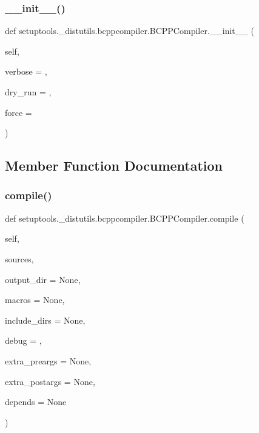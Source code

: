 \subsubsection{\texorpdfstring{\+\_\+\+\_\+init\+\_\+\+\_\+()}{\_\_init\_\_()}}
{\footnotesize\ttfamily def setuptools.\+\_\+distutils.\+bcppcompiler.\+B\+C\+P\+P\+Compiler.\+\_\+\+\_\+init\+\_\+\+\_\+ (\begin{DoxyParamCaption}\item[{}]{self,  }\item[{}]{verbose = {},  }\item[{}]{dry\+\_\+run = {},  }\item[{}]{force = {} }\end{DoxyParamCaption})}



\subsection{Member Function Documentation}
\mbox{\label{classsetuptools_1_1__distutils_1_1bcppcompiler_1_1BCPPCompiler_a0bcc35ed8d94b790b4080b431aa900f6}} 
\subsubsection{\texorpdfstring{compile()}{compile()}}
{\footnotesize\ttfamily def setuptools.\+\_\+distutils.\+bcppcompiler.\+B\+C\+P\+P\+Compiler.\+compile (\begin{DoxyParamCaption}\item[{}]{self,  }\item[{}]{sources,  }\item[{}]{output\+\_\+dir = {\ttfamily None},  }\item[{}]{macros = {\ttfamily None},  }\item[{}]{include\+\_\+dirs = {\ttfamily None},  }\item[{}]{debug = {},  }\item[{}]{extra\+\_\+preargs = {\ttfamily None},  }\item[{}]{extra\+\_\+postargs = {\ttfamily None},  }\item[{}]{depends = {\ttfamily None} }\end{DoxyParamCaption})}

